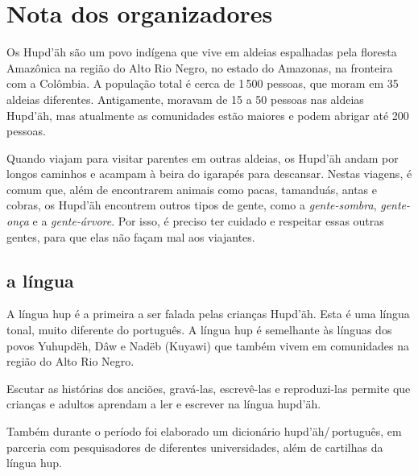 \chapter{Nota dos organizadores}

Os Hupd’äh são um povo indígena que vive em aldeias espalhadas pela floresta Amazônica na região do Alto Rio Negro, no estado do Amazonas, na fronteira com a Colômbia. A população total é cerca de 1\,500 pessoas, que moram em 35 aldeias diferentes. Antigamente, moravam de 15 a 50 pessoas nas aldeias Hupd’äh, mas atualmente as comunidades estão maiores e podem abrigar até 200 pessoas.


Quando viajam para visitar parentes em outras aldeias, os Hupd’äh andam por longos caminhos e acampam à beira do igarapés para descansar. Nestas viagens, é comum que, além de encontrarem animais como pacas, tamanduás, antas e cobras, os Hupd’äh encontrem outros tipos de gente, como a \textit{gente-sombra}, \textit{gente-onça} e a \textit{gente-árvore}. Por isso, é preciso ter cuidado e respeitar essas outras gentes, para que elas não façam mal aos viajantes.

\section{a língua}

A língua hup é a primeira a ser falada pelas crianças Hupd’äh. Esta é uma língua tonal, muito
diferente do português. A língua hup é semelhante às línguas dos povos Yuhupdëh,
Dâw e Nadëb (Kuyawi) que também vivem em comunidades na região do Alto Rio Negro.


Escutar as histórias dos anciões, gravá-las, escrevê-las e reproduzi-las permite que
crianças e adultos aprendam a ler e escrever na língua hupd’äh.

Também durante o período foi elaborado um dicionário hupd’äh/\,português, em parceria
com pesquisadores de diferentes universidades, além de cartilhas da língua hup.